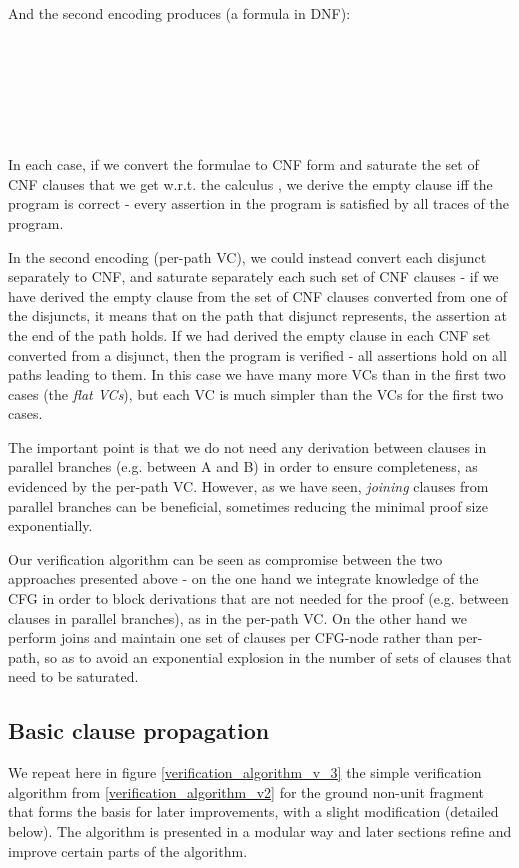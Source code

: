 \bigskip

And the second encoding produces (a formula in DNF):\\
\\
\\
\\
\\
\\
\\

In each case, if we convert the formulae to CNF form and saturate the set of CNF clauses that we get w.r.t. the calculus \SPG, we derive the empty clause iff the program is correct - every assertion in the program is satisfied by all traces of the program.

In the second encoding (per-path VC), we could instead convert each disjunct separately to CNF, 
and saturate separately each such set of CNF clauses - if we have derived the empty clause from the set of CNF clauses converted from one of the disjuncts, it means that on the path that disjunct represents, the assertion at the end of the path holds. 
If we had derived the empty clause in each CNF set converted from a disjunct, then the program is verified - all assertions hold on all paths leading to them. 
In this case we have many more VCs than in the first two cases (the \emph{flat VCs}), but each VC is much simpler than the VCs for the first two cases.

The important point is that we do not need any derivation between clauses in parallel branches (e.g. between A and B) in order to ensure completeness, as evidenced by the per-path VC.
However, as we have seen, \emph{joining} clauses from parallel branches can be beneficial, sometimes reducing the minimal proof size exponentially.

Our verification algorithm can be seen as compromise between the two approaches presented above - on the one hand we integrate knowledge of the CFG in order to block derivations that are not needed for the proof (e.g. between clauses in parallel branches), as in the per-path VC.
On the other hand we perform joins and maintain one set of clauses per CFG-node rather than per-path, so as to avoid an exponential explosion in the number of sets of clauses that need to be saturated.

\subsection{Basic clause propagation}\label{section_basic_clause_propagation}
We repeat here in figure \ref{verification_algorithm_v_3} the simple verification algorithm from \ref{verification_algorithm_v2} for the ground non-unit fragment that forms the basis for later improvements, with a slight modification (detailed below).
The algorithm is presented in a modular way and later sections refine and improve certain parts of the algorithm.


